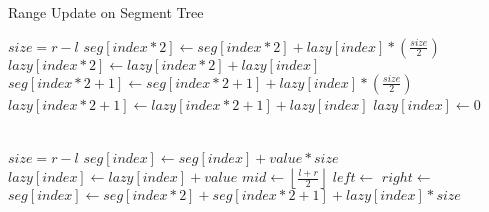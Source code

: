 \begin{algorithm}
    \caption{Range Update on Segment Tree }
    \begin{algorithmic}
            \State $size = r - l$
                \State $seg[index*2] \gets seg[index*2] + lazy[index] * \left( \frac{size}{2} \right)$
                \State $lazy[index*2] \gets lazy[index*2] + lazy[index]$
                \State $seg[index*2+1] \gets seg[index*2+1] + lazy[index] * \left( \frac{size}{2} \right)$
                \State $lazy[index*2+1] \gets lazy[index*2+1] + lazy[index]$
                \State $lazy[index] \gets 0$
            \EndIf
        \EndProcedure

        \\

         
            \State $size = r - l$
                \State \Return
                \State $seg[index] \gets {seg[index] + value*size}$
                \State $lazy[index] \gets {lazy[index] + value}$
                \State \Return
            \Else
                \State {}
                \State $mid \gets \left\lfloor \frac{l + r}{2} \right\rfloor$
                \State $left \gets$ 
                \State $right \gets$ 
                \State $seg[index] \gets {seg[index*2] + seg[index*2+1] + lazy[index]*size}$ 
            \EndIf
        \EndProcedure
    \end{algorithmic}
\end{algorithm}